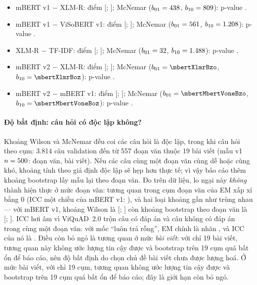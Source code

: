 \begin{itemize}
  \item mBERT v1 $-$ XLM-R: \mbertVoneXlmrDiffEM{} điểm
        [\mbertVoneXlmrDiffEMclo; \mbertVoneXlmrDiffEMchi]; McNemar
        ($b_{01} = 438$, $b_{10} = 809$): p-value \mbertVoneXlmrP.
  \item mBERT v1 $-$ ViSoBERT v1: \mbertVoneVisoVoneDiffEM{} điểm
        [\mbertVoneVisoVoneDiffEMclo; \mbertVoneVisoVoneDiffEMchi]; McNemar
        ($b_{01} = 561$, $b_{10} = 1.208$): p-value
        \mbertVoneVisoVoneP.
  \item XLM-R $-$ TF-IDF: \xlmrBaselineDiffEM{} điểm
        [\xlmrBaselineDiffEMclo; \xlmrBaselineDiffEMchi]; McNemar
        ($b_{01} = 32$, $b_{10} = 1.488$): p-value \xlmrBaselineP.
\ifhasDev
  \item mBERT v2 $-$ XLM-R: \mbertXlmrDiffEM{} điểm [\mbertXlmrDiffEMclo; \mbertXlmrDiffEMchi];
        McNemar ($b_{01} = \mbertXlmrBzo$, $b_{10} = \mbertXlmrBoz$): p-value \mbertXlmrP.
  \item mBERT v2 $-$ mBERT v1: \mbertMbertVoneDiffEM{} điểm
        [\mbertMbertVoneDiffEMclo; \mbertMbertVoneDiffEMchi]; McNemar
        ($b_{01} = \mbertMbertVoneBzo$, $b_{10} = \mbertMbertVoneBoz$): p-value \mbertMbertVoneP.
\fi
\end{itemize}
\fi\fi

\paragraph{Độ bất định: câu hỏi có độc lập không?} Khoảng Wilson và McNemar đều coi các câu hỏi
là độc lập, trong khi câu hỏi theo cụm: 3.814 câu validation đến từ 557 đoạn văn thuộc 19 bài viết
(mẫu v1 $n = 500$: \overlapHistContexts{} đoạn văn, \overlapHistArticles{} bài viết). Nếu các
câu cùng một đoạn văn cùng dễ hoặc cùng khó, khoảng tính theo giả định độc lập sẽ hẹp hơn thực tế;
vì vậy báo cáo thêm khoảng bootstrap lấy mẫu lại theo đoạn văn.
\ifhasStats
Đo trên dữ liệu, lo ngại này \emph{không} thành hiện thực ở mức đoạn văn: tương quan trong cụm
đoạn văn của EM xấp xỉ bằng 0 (ICC một chiều của mBERT v1: \mbertVoneICC), và hai loại khoảng gần
như trùng nhau --- với mBERT v1, khoảng Wilson là [\mbertVoneEMlo; \mbertVoneEMhi] còn khoảng
bootstrap theo đoạn văn là [\mbertVoneEMclo; \mbertVoneEMchi]. ICC hơi âm vì ViQuAD~2.0 trộn câu
có đáp án và câu không có đáp án trong cùng một đoạn văn: với mốc ``luôn trả rỗng'', EM chính là
nhãn , và ICC của nó là \alwaysEmptyICC. Điều còn bỏ ngỏ là tương quan ở mức \emph{bài viết}: với chỉ 19
bài viết, tương quan này không ước lượng tin cậy được và bootstrap trên 19 cụm quá bất ổn để báo
cáo, nên độ bất định do chọn chủ đề bài viết chưa được lượng hoá.
\else
Ở mức bài viết, với chỉ 19 cụm, tương quan không ước lượng tin cậy được và bootstrap trên 19 cụm
quá bất ổn để báo cáo; đây là giới hạn còn bỏ ngỏ.
\fi

